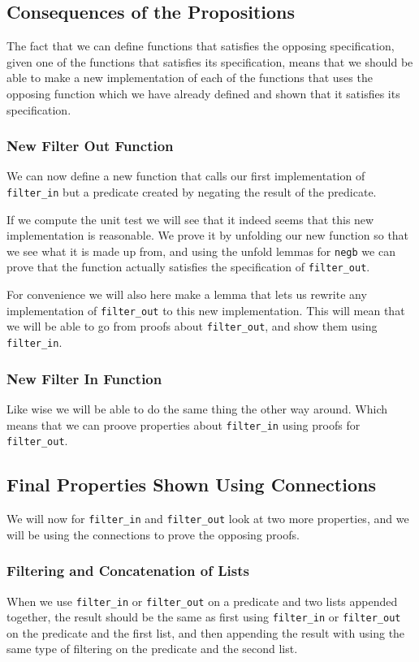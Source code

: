 \documentclass{article}
\begin{document}
\subsection{Consequences of the Propositions}
The fact that we can define functions that satisfies the opposing specification, given one of the functions that satisfies its specification, means that we should be able to make a new implementation of each of the functions that uses the opposing function which we have already defined and shown that it satisfies its specification.

\subsubsection{New Filter Out Function}
We can now define a new function that calls our first implementation of \texttt{filter\_in} but a predicate created by negating the result of the predicate.

If we compute the unit test we will see that it indeed seems that this new implementation is reasonable. We prove it by unfolding our new function so that we see what it is made up from, and using the unfold lemmas for \texttt{negb} we can prove that the function actually satisfies the specification of \texttt{filter\_out}.

For convenience we will also here make a lemma that lets us rewrite any implementation of \texttt{filter\_out} to this new implementation. This will mean that we will be able to go from proofs about \texttt{filter\_out}, and show them using \texttt{filter\_in}.

\subsubsection{New Filter In Function}
Like wise we will be able to do the same thing the other way around. Which means that we can proove properties about \texttt{filter\_in} using proofs for \texttt{filter\_out}.

\subsection{Final Properties Shown Using Connections}
We will now for \texttt{filter\_in} and \texttt{filter\_out} look at two more properties, and we will be using the connections to prove the opposing proofs.

\subsubsection{Filtering and Concatenation of Lists}
When we use \texttt{filter\_in} or \texttt{filter\_out} on a predicate and two lists appended together, the result should be the same as first using \texttt{filter\_in} or \texttt{filter\_out} on the predicate and the first list, and then appending the result with using the same type of filtering on the predicate and the second list.
\end{document}

